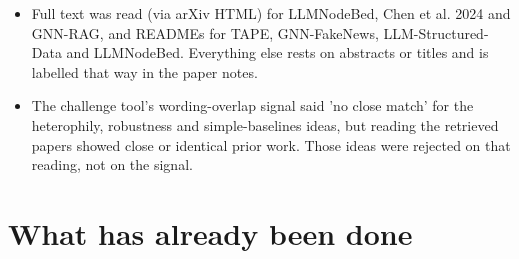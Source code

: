\documentclass[11pt,a4paper]{article}
\begin{document}
\begin{itemize}
\item Full text was read (via arXiv HTML) for LLMNodeBed, Chen et al. 2024 and GNN-RAG, and READMEs for TAPE, GNN-FakeNews, LLM-Structured-Data and LLMNodeBed. Everything else rests on abstracts or titles and is labelled that way in the paper notes.
\item The challenge tool's wording-overlap signal said 'no close match' for the heterophily, robustness and simple-baselines ideas, but reading the retrieved papers showed close or identical prior work. Those ideas were rejected on that reading, not on the signal.
\end{itemize}

\section{What has already been done}
\end{document}
